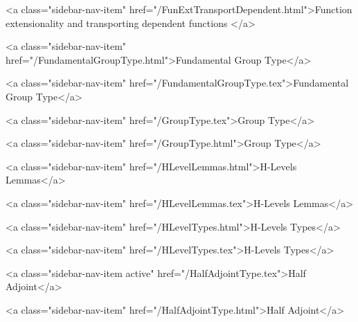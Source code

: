       
        
          <a class="sidebar-nav-item" href="/FunExtTransportDependent.html">Function extensionality and transporting dependent functions </a>
        
      
    
      
        
          <a class="sidebar-nav-item" href="/FundamentalGroupType.html">Fundamental Group Type</a>
        
      
    
      
        
          <a class="sidebar-nav-item" href="/FundamentalGroupType.tex">Fundamental Group Type</a>
        
      
    
      
        
          <a class="sidebar-nav-item" href="/GroupType.tex">Group Type</a>
        
      
    
      
        
          <a class="sidebar-nav-item" href="/GroupType.html">Group Type</a>
        
      
    
      
        
          <a class="sidebar-nav-item" href="/HLevelLemmas.html">H-Levels Lemmas</a>
        
      
    
      
        
          <a class="sidebar-nav-item" href="/HLevelLemmas.tex">H-Levels Lemmas</a>
        
      
    
      
        
          <a class="sidebar-nav-item" href="/HLevelTypes.html">H-Levels Types</a>
        
      
    
      
        
          <a class="sidebar-nav-item" href="/HLevelTypes.tex">H-Levels Types</a>
        
      
    
      
        
          <a class="sidebar-nav-item active" href="/HalfAdjointType.tex">Half Adjoint</a>
        
      
    
      
        
          <a class="sidebar-nav-item" href="/HalfAdjointType.html">Half Adjoint</a>
        
